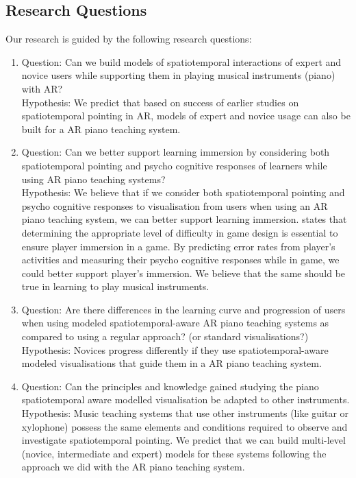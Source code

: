 \documentclass[manuscript,screen]{acmart}
\begin{document}
\subsection{Research Questions}
Our research is guided by the following research questions: 
\begin{enumerate}
    \item Question: Can we build models of spatiotemporal interactions of expert and novice users while supporting them in playing musical instruments (piano) with AR?  \\
    Hypothesis: We predict that based on success of earlier studies on spatiotemporal pointing in AR, models of expert and novice usage can also be built for a AR piano teaching system. 
    \item Question: Can we better support learning immersion by considering both spatiotemporal pointing and psycho cognitive responses of learners while using AR piano teaching systems?\\
    Hypothesis: We believe that if we consider both spatiotemporal pointing and psycho cognitive responses to visualisation from users when using an AR piano teaching system, we can better support learning immersion.  \citet{lee2016website} states that determining the appropriate level of difficulty in game design is essential to ensure player immersion in a game. By predicting error rates from player’s activities and measuring their psycho cognitive responses while in game, we could better support player’s immersion. We believe that the same should be true in learning to play musical instruments.
    \item Question: Are there differences in the learning curve and progression of users when using modeled spatiotemporal-aware AR piano teaching systems as compared to using a regular approach? (or standard visualisations?)\\
    Hypothesis: Novices progress differently if they use spatiotemporal-aware modeled visualisations that guide them in a AR piano teaching system.
    \item Question: Can the principles and knowledge gained studying the piano spatiotemporal aware modelled visualisation be adapted to other instruments.\\
    Hypothesis: Music teaching systems that use other instruments (like guitar or xylophone) possess the same elements and conditions required to observe and investigate spatiotemporal pointing. We predict that we can build multi-level (novice, intermediate and expert) models for these systems following the approach we did with the AR piano teaching system.
\end{enumerate}
\end{document}

